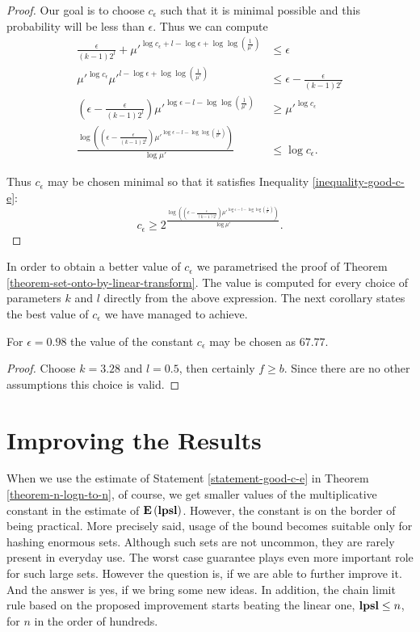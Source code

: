 \begin{proof}
Our goal is to choose $c_{\epsilon}$ such that it is minimal possible and this probability will be less than $\epsilon$. Thus we can compute
\[
\begin{split}
\frac{\epsilon}{(k - 1) 2 ^ l} + {\mu'}^{\log c_\epsilon + l - \log \epsilon + \log \log \left(\frac{1}{\mu'}\right)} & \leq \epsilon \\
{\mu'}^{\log c_\epsilon}{\mu'}^{l - \log \epsilon + \log \log \left(\frac{1}{\mu'}\right)} & \leq \epsilon - \frac{\epsilon}{(k - 1) 2 ^ l} \\
\left(\epsilon - \frac{\epsilon}{(k - 1) 2 ^ l}\right) {\mu'}^{\log \epsilon - l - \log \log \left(\frac{1}{\mu'}\right)} & \geq {\mu'}^{\log c_\epsilon} \\
\frac{\log \left( \left( \epsilon - \frac{\epsilon}{(k - 1) 2 ^ l}\right) {\mu'}^{\log \epsilon - l - \log \log \left(\frac{1}{\mu'}\right)}\right)}{\log \mu'} & \leq {\log c_\epsilon} \text{.}
\end{split}
\]

Thus $c_\epsilon$ may be chosen minimal so that it satisfies Inequality \ref{inequality-good-c-e}:
\[
c_\epsilon \geq 2 ^ {\frac{\log \left( \left( \epsilon - \frac{\epsilon}{(k - 1) 2 ^ l}\right) {\mu'}^{\log \epsilon - l - \log \log \left(\frac{1}{\mu'}\right)}\right)}{\log \mu'}} \text{.}
\]
\end{proof}

In order to obtain a better value of $c_\epsilon$ we parametrised the proof of Theorem \ref{theorem-set-onto-by-linear-transform}. The value is computed for every choice of parameters $k$ and $l$ directly from the above expression. The next corollary states the best value of $c_\epsilon$ we have managed to achieve.

\begin{corollary}
For $\epsilon = 0.98$ the value of the constant $c_\epsilon$ may be chosen as $67.77$.
\end{corollary}
\begin{proof}
Choose $k = 3.28$ and $l = 0.5$, then certainly $f \geq b$. Since there are no other assumptions this choice is valid.
\end{proof}

\section{Improving the Results}
When we use the estimate of Statement \ref{statement-good-c-e} in Theorem \ref{theorem-n-logn-to-n}, of course, we get smaller values of the multiplicative constant in the estimate of $\mathbf{E}\left(\mathbf{lpsl}\right)$. However, the constant is on the border of being practical. More precisely said, usage of the bound becomes suitable only for hashing enormous sets. Although such sets are not uncommon, they are rarely present in everyday use. The worst case guarantee plays even more important role for such large sets. However the question is, if we are able to further improve it. And the answer is yes, if we bring some new ideas. In addition, the chain limit rule based on the proposed improvement starts beating the linear one, $\mathbf{lpsl} \leq n$, for $n$ in the order of hundreds.

